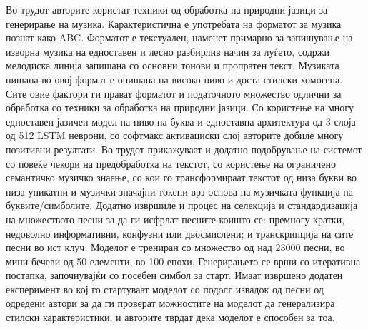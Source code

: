Во трудот \cite{Sturm2016} авторите користат техники од обработка на природни јазици за генерирање на музика. Карактеристична е употребата на форматот за музика познат како ABC. Форматот е текстуален, наменет примарно за запишување на изворна музика на едноставен и лесно разбирлив начин за луѓето, содржи мелодиска линија запишана со основни тонови и пропратен текст. Музиката пишана во овој формат е опишана на високо ниво и доста стилски хомогена. Сите овие фактори ги прават форматот и податочното множество одлични за обработка со техники за обработка на природни јазици. Со користење на многу едноставен јазичен модел на ниво на буква и едноставна архитектура од 3 слоја од 512 LSTM неврони, со софтмакс активациски слој авторите добиле многу позитивни резултати. Во трудот прикажуваат и додатно подобрување на системот со повеќе чекори на предобработка на текстот, со користење на ограничено семантичко музичко знаење, со кои го трансформираат текстот од низа букви во низа уникатни и музички значајни токени врз основа на музичката функција на буквите/симболите. Додатно извршиле и процес на селекција и стандардизација на множеството песни за да ги исфрлат песните коишто се: премногу кратки, недоволно информативни, конфузни или двосмислени; и транскрипција на сите песни во ист клуч. Моделот е трениран со множество од над 23000 песни, во мини-бечеви од 50 елементи, во 100 епохи. Генерирањето се врши со итеративна постапка, започнувајќи со посебен симбол за старт. Имаат извршено додатен експеримент во кој го стартуваат моделот со подолг извадок од песни од одредени автори за да ги проверат можностите на моделот да генерализира стилски карактеристики, и авторите тврдат дека моделот е способен за тоа.

